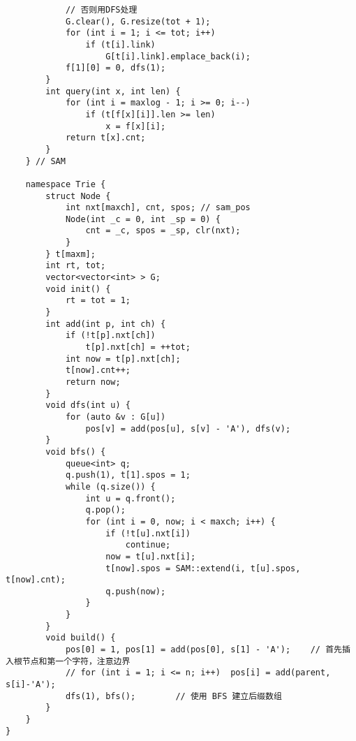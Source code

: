 \begin{verbatim}
            // 否则用DFS处理 
            G.clear(), G.resize(tot + 1);
            for (int i = 1; i <= tot; i++)
                if (t[i].link)
                    G[t[i].link].emplace_back(i);
            f[1][0] = 0, dfs(1);
        }
        int query(int x, int len) {
            for (int i = maxlog - 1; i >= 0; i--)
                if (t[f[x][i]].len >= len)
                    x = f[x][i];
            return t[x].cnt;
        }
    } // SAM
    
    namespace Trie {
        struct Node {
            int nxt[maxch], cnt, spos; // sam_pos
            Node(int _c = 0, int _sp = 0) {
                cnt = _c, spos = _sp, clr(nxt);
            }
        } t[maxm];
        int rt, tot;
        vector<vector<int> > G;
        void init() {
            rt = tot = 1;
        }
        int add(int p, int ch) {
            if (!t[p].nxt[ch])
                t[p].nxt[ch] = ++tot;
            int now = t[p].nxt[ch];
            t[now].cnt++;
            return now;
        }
        void dfs(int u) {
            for (auto &v : G[u])
                pos[v] = add(pos[u], s[v] - 'A'), dfs(v);
        }
        void bfs() {
            queue<int> q;
            q.push(1), t[1].spos = 1;
            while (q.size()) {
                int u = q.front();
                q.pop();
                for (int i = 0, now; i < maxch; i++) {
                    if (!t[u].nxt[i])
                        continue;
                    now = t[u].nxt[i];
                    t[now].spos = SAM::extend(i, t[u].spos, t[now].cnt);
                    q.push(now);
                }
            }
        }
        void build() {
            pos[0] = 1, pos[1] = add(pos[0], s[1] - 'A');    // 首先插入根节点和第一个字符，注意边界 
            // for (int i = 1; i <= n; i++)  pos[i] = add(parent, s[i]-'A');
            dfs(1), bfs();        // 使用 BFS 建立后缀数组 
        }
    }
}
\end{verbatim}

\clearpage